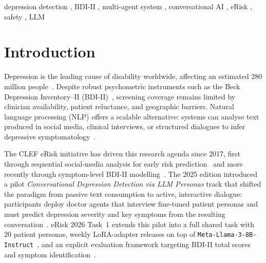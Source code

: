\documentclass[]{ceurart}
\begin{document}
\begin{keywords}
  depression detection \sep
  BDI-II \sep
  multi-agent system \sep
  conversational AI \sep
  eRisk \sep
  safety \sep
  LLM
\end{keywords}

\maketitle

\section{Introduction}\label{sec:intro}

Depression is the leading cause of disability worldwide, affecting an estimated 280 million people~\cite{WHO2023depression}.
Despite robust psychometric instruments such as the Beck Depression Inventory--II (BDI-II)~\cite{Beck1996bdi}, screening coverage remains limited by clinician availability, patient reluctance, and geographic barriers.
Natural language processing (NLP) offers a scalable alternative: systems can analyse text produced in social media, clinical interviews, or structured dialogues to infer depressive symptomatology~\cite{DepressionNLP2024survey}.

The CLEF eRisk initiative has driven this research agenda since 2017, first through sequential social-media analysis for early risk prediction~\cite{Losada2016erisk} and more recently through symptom-level BDI-II modelling~\cite{Parapar2023erisk,Parapar2024erisk}.
The 2025 edition introduced a pilot \emph{Conversational Depression Detection via LLM Personas} track that shifted the paradigm from passive text consumption to active, interactive dialogue: participants deploy doctor agents that interview fine-tuned patient personas and must predict depression severity and key symptoms from the resulting conversation~\cite{Parapar2025erisk}.
eRisk 2026 Task~1 extends this pilot into a full shared task with 20 patient personas, weekly LoRA-adapter releases on top of \texttt{Meta-Llama-3-8B-Instruct}~\cite{Dubey2024llama3}, and an explicit evaluation framework targeting BDI-II total scores and symptom identification~\cite{PerezEtAl2026eRiskWorkingNotes}.
\end{document}
